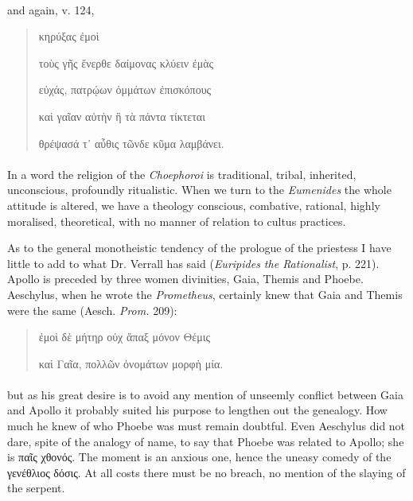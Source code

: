 \documentclass[a4paper, 11pt, oneside, polutonikogreek, english]{article}
\begin{document}
\paragraph{}
and again, v. 124,
\begin{quotation}
\hspace*{20mm}κηρύξας ἐμοὶ

τοὺς γῆς ἔνερθε δαίμονας κλύειν ἐμὰς

εὐχάς, πατρῴων ὀμμάτων ἐπισκόπους

καὶ γαῖαν αὐτὴν ἣ τὰ πάντα τίκτεται

θρέψασά τ᾽ αὖθις τῶνδε κῦμα λαμβάνει.
\end{quotation}
\paragraph{}
In a word the religion of the \emph{Choephoroi} is traditional, tribal, inherited, unconscious, profoundly ritualistic. When we turn to the \emph{Eumenides} the whole attitude is altered, we have a theology conscious, combative, rational, highly moralised, theoretical, with no manner of relation to cultus practices.

As to the general monotheistic tendency of the prologue of the priestess I have little to add to what Dr. Verrall has said (\emph{Euripides the Rationalist}, p. 221). Apollo is preceded by three women divinities, Gaia, Themis and Phoebe. Aeschylus, when he wrote the \emph{Prometheus}, certainly knew that Gaia and Themis were the same (Aesch. \emph{Prom.} 209):
\begin{quotation}
ἐμοὶ δὲ μήτηρ οὐχ ἅπαξ μόνον Θέμις

καὶ Γαῖα, πολλῶν ὀνομάτων μορφὴ μία.
\end{quotation}
\paragraph{}
but as his great desire is to avoid any mention of unseemly conflict between Gaia and Apollo it probably suited his purpose to lengthen out the genealogy. How much he knew of who Phoebe was must remain doubtful. Even Aeschylus did not dare, spite of the analogy of name, to say that Phoebe was related to Apollo; she is παῖς χθονός. The moment is an anxious one, hence the uneasy comedy of the γενέθλιος δόσις. At all costs there must be no breach, no mention of the slaying of the serpent.
\end{document}
